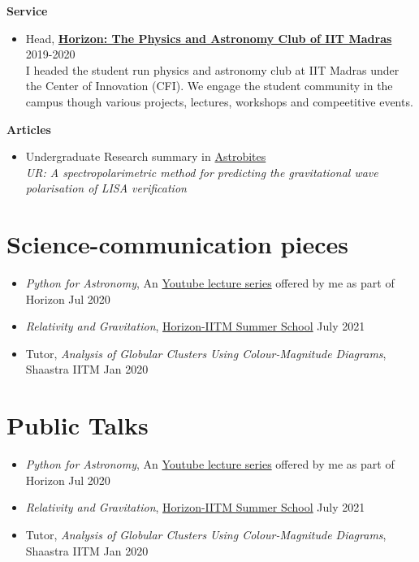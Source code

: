 \documentclass[margin, centered]{res}
\begin{document}
\begin{resume}
\textbf{Service}
\begin{itemize}[leftmargin=*]
    \item Head, \href{https://horizoniitm.github.io/horizon/}{\textbf{Horizon: The Physics and Astronomy Club of IIT Madras}} \hfill 2019-2020\\
     I headed the student run physics and astronomy club at IIT Madras under the Center of Innovation (CFI).
    We engage the student community in the campus though various projects, lectures, workshops and compeetitive events.
\end{itemize}
\textbf{Articles}
\begin{itemize}[leftmargin=*]
    \item Undergraduate Research summary in \href{https://astrobites.org/2021/06/20/ur-a-spectropolarimetric-method-for-predicting-the-gravitational-wave-polarisation-of-lisa-verification-binaries/}{Astrobites} \\ \textit{\color{C2} UR: A spectropolarimetric method for predicting the gravitational wave polarisation of LISA verification }
\end{itemize}

\section{Science-communication pieces}
\begin{itemize}[leftmargin=*]
    \item \textit{\color{C2} Python for Astronomy}, An \href{https://youtu.be/HfYR0uwYAyM}{Youtube lecture series} offered by me as part of Horizon \hfill Jul 2020
    \item \textit{\color{C2} Relativity and Gravitation}, \href{https://github.com/HorizonIITM/summer-school-2021}{Horizon-IITM Summer School} \hfill July 2021
    \item Tutor, \textit{\color{C2} Analysis of Globular Clusters Using
    Colour-Magnitude Diagrams}, Shaastra IITM \hfill Jan 2020
\end{itemize}


\section{Public Talks}
\begin{itemize}[leftmargin=*]
    \item \textit{\color{C2} Python for Astronomy}, An \href{https://youtu.be/HfYR0uwYAyM}{Youtube lecture series} offered by me as part of Horizon \hfill Jul 2020
    \item \textit{\color{C2} Relativity and Gravitation}, \href{https://github.com/HorizonIITM/summer-school-2021}{Horizon-IITM Summer School} \hfill July 2021
    \item Tutor, \textit{\color{C2} Analysis of Globular Clusters Using
    Colour-Magnitude Diagrams}, Shaastra IITM \hfill Jan 2020
\end{itemize}






\end{resume}
\end{document}
